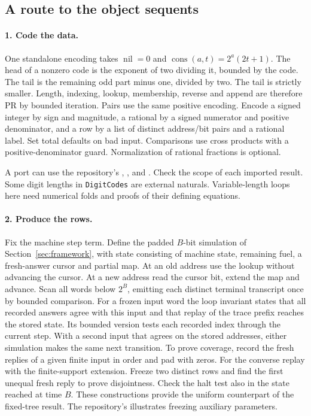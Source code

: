 \subsection{A route to the object sequents}
\paragraph{1. Code the data.}
One standalone encoding takes $\operatorname{nil}=0$ and $\operatorname{cons}(a,t)=2^a(2t+1)$. The head of a nonzero code is the exponent of two dividing it, bounded by the code. The tail is the remaining odd part minus one, divided by two. The tail is strictly smaller. Length, indexing, lookup, membership, reverse and append are therefore PR by bounded iteration. Pairs use the same positive encoding. Encode a signed integer by sign and magnitude, a rational by a signed numerator and positive denominator, and a row by a list of distinct address/bit pairs and a rational label. Set total defaults on bad input. Comparisons use cross products with a positive-denominator guard. Normalization of rational fractions is optional.

A port can use the repository's , , and . Check the scope of each imported result. Some digit lengths in \texttt{DigitCodes} are external naturals. Variable-length loops here need numerical folds and proofs of their defining equations.

\paragraph{2. Produce the rows.}
Fix the machine step term. Define the padded $B$-bit simulation of Section~\ref{sec:framework}, with state consisting of machine state, remaining fuel, a fresh-answer cursor and partial map. At an old address use the lookup without advancing the cursor. At a new address read the cursor bit, extend the map and advance. Scan all words below $2^B$, emitting each distinct terminal transcript once by bounded comparison. For a frozen input word the loop invariant states that all recorded answers agree with this input and that replay of the trace prefix reaches the stored state. Its bounded version tests each recorded index through the current step. With a second input that agrees on the stored addresses, either simulation makes the same next transition. To prove coverage, record the fresh replies of a given finite input in order and pad with zeros. For the converse replay with the finite-support extension. Freeze two distinct rows and find the first unequal fresh reply to prove disjointness. Check the halt test also in the state reached at time $B$. These constructions provide the uniform counterpart of the fixed-tree result. The repository's  illustrates freezing auxiliary parameters.

